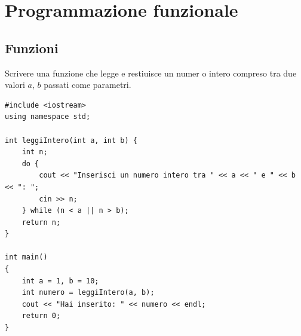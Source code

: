\documentclass[11pt,fleqn]{book}
\begin{document}





\chapter{Programmazione funzionale}

\section{Funzioni}

\begin{esercizio}[2]
    Scrivere una funzione che legge e restiuisce un numer o intero compreso tra due valori $a$, $b$ passati come parametri.

    \ifsoluzioni
    \solution
    \begin{lstlisting}[style=cpp]
#include <iostream>
using namespace std;

int leggiIntero(int a, int b) {
    int n;
    do {
        cout << "Inserisci un numero intero tra " << a << " e " << b << ": ";
        cin >> n;
    } while (n < a || n > b);
    return n;
}

int main() 
{
    int a = 1, b = 10;
    int numero = leggiIntero(a, b);
    cout << "Hai inserito: " << numero << endl;
    return 0;
}
    \end{lstlisting}
    \fi
\end{esercizio}




\end{document}
